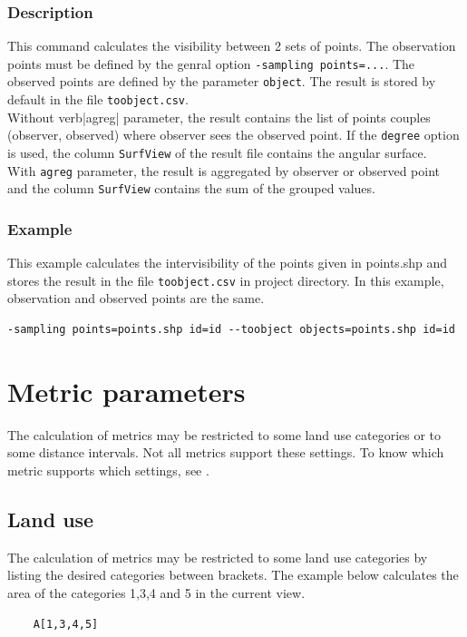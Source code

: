 \documentclass{report}
\begin{document}
\subsubsection{Description}
This command calculates the visibility between 2 sets of points. The observation points must be defined by the genral option \verb|-sampling points=...|. The observed points are defined by the parameter \verb|object|. The result is stored by default in the file \verb|toobject.csv|.\\
Without verb|agreg| parameter, the result contains the list of points couples (observer, observed) where observer sees the observed point. If the \verb|degree| option is used, the column \verb|SurfView| of the result file contains the angular surface.\\
With \verb|agreg| parameter, the result is aggregated by observer or observed point and the column \verb|SurfView| contains the sum of the grouped values.

\subsubsection{Example}
This example calculates the intervisibility of the points given in points.shp and stores the result in the file \verb|toobject.csv| in project directory. In this example, observation and observed points are the same.
\begin{Verbatim}
-sampling points=points.shp id=id --toobject objects=points.shp id=id
\end{Verbatim}


\section{Metric parameters}
\label{param_metrics_cli}
The calculation of metrics may be restricted to some land use categories or to some distance intervals. Not all metrics support these settings. To know which metric supports which settings, see .

\subsection{Land use}
The calculation of metrics may be restricted to some land use categories by listing the desired categories between brackets. The example below calculates the area of the categories 1,3,4 and 5 in the current view.
\begin{Verbatim}
	A[1,3,4,5]
\end{Verbatim}
\end{document}
